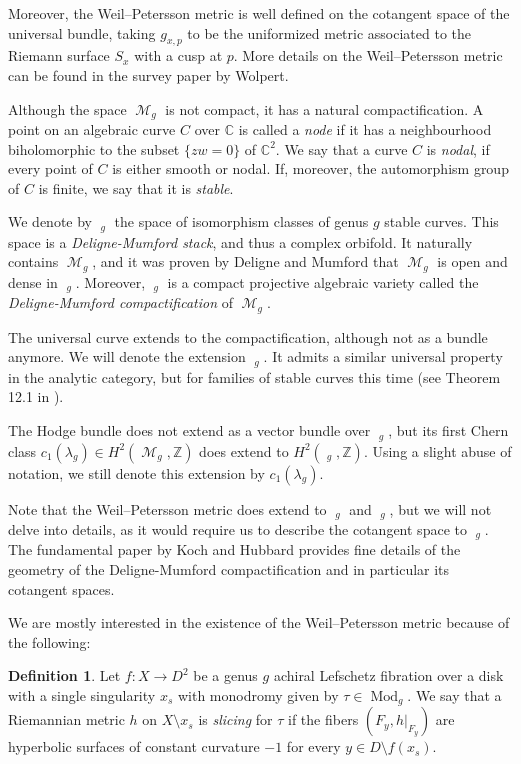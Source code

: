 \documentclass{article}
\DeclareMathOperator{\dm}{\overline{\mathcal{M}}}
\DeclareMathOperator{\m}{\mathcal{M}}
\DeclareMathOperator{\scr}{\overline{\mathcal{C}}}
\DeclareMathOperator{\mo}{\text{Mod}}
\theoremstyle{plain}
\theoremstyle{remark}
\theoremstyle{definition}
\newtheorem{defin}{Definition}[section]
\begin{document}
Moreover, the Weil--Petersson metric is well defined on the cotangent space of the universal bundle, taking $g_{x,p}$ to be the uniformized metric associated to the Riemann surface $S_x$ with a cusp at $p$. More details on the Weil--Petersson metric can be found in the survey paper \cite{Wolpert} by Wolpert. \par 
Although the space $\m_g$ is not compact, it has a natural compactification. A point on an algebraic curve $C$ over $\mathbb{C}$ is called a \emph{node} if it has a neighbourhood biholomorphic to the subset $\{zw=0\}$ of $\mathbb{C}^2$. We say that a curve $C$ is \emph{nodal}, if every point of $C$ is either smooth or nodal. If, moreover, the automorphism group of $C$ is finite, we say that it is \emph{stable}. \par
We denote by $\dm_g$ the space of isomorphism classes of genus $g$ stable curves. This space is a \emph{Deligne-Mumford stack}, and thus a complex orbifold. It naturally contains $\m_g$, and it was proven by Deligne and Mumford \cite{DM} that $\m_g$ is open and dense in $\dm_g$. Moreover, $\dm_g$ is a compact projective algebraic variety called the \emph{Deligne-Mumford compactification} of $\m_g$. \par 
The universal curve extends to the compactification, although not as a bundle anymore. We will denote the extension $\scr_g$. It admits a similar universal property in the analytic category, but for families of stable curves this time (see Theorem 12.1 in \cite{HUbbardKoch}). \par 
The Hodge bundle does not extend as a vector bundle over $\dm_g$, but its first Chern class $c_1(\lambda_g) \in H^2(\m_g, \mathbb{Z})$ does extend to $H^2(\dm_g,\mathbb{Z})$. Using a slight abuse of notation, we still denote this extension by $c_1(\lambda_g)$. \par 
Note that the Weil--Petersson metric does extend to $\dm_g$ and $\scr_g$, but we will not delve into details, as it would require us to describe the cotangent space to $\dm_g$. The fundamental paper \cite{HUbbardKoch} by Koch and Hubbard provides fine details of the geometry of the Deligne-Mumford compactification and in particular its cotangent spaces. \par 
We are mostly interested in the existence of the Weil--Petersson metric because of the following\thinspace:
\begin{defin}
    Let $f: X\to D^2$ be a genus $g$ achiral Lefschetz fibration over a disk with a single singularity $x_s$ with monodromy given by $\tau\in \mo_g$. We say that a Riemannian metric $h$ on $X\setminus {x_s}$ is \emph{slicing} for $\tau$ if the fibers $(F_y, h|_{F_y})$ are hyperbolic surfaces of constant curvature $-1$ for every $y\in D\setminus f(x_s)$.
\end{defin}
\end{document}
